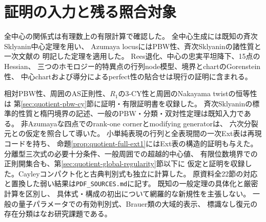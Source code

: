 \documentclass[11pt,a4paper]{ltjsarticle}
\begin{document}








\section{証明の入力と残る照合対象}
全中心の関係式は有理数上の有限計算で確認した。
全中心生成には既知の斉次Sklyanin中心定理を用い、
Azumaya locusにはPBW性、斉次Sklyaninの諸性質と
一次文献\cite{WWYSklyanin,LevasseurNoncomm,BrownMacleod}の
明記した定理を適用した。
Rees退化、中心の忠実平坦降下、15点のHessian、
三つのホモロジー的特異点の行列node模型、境界とchartのGorenstein性、
中心chartおよび導分によるperfect性の貼合せは現行の証明に含まれる。

相対PBW性、周囲のAS正則性、$R_1$の3-CY性と周囲のNakayama twistの恒等性は
第\ref{sec:quotient-pbw-cy}節に証明・有限証明書を収録した。
斉次Sklyaninの標準的性質と楕円境界の記述、一般のPBW・分類・双対性定理は既知入力である。
非Azumayaな四点でのrank-one cornerとmodifying generatorは、
六次分裂元と\cite[Theorem~5.1(1)]{IW}の仮定を照合して導いた。
小単純表現の行列と全表現間の一次Ext表は再現コードを持ち、
命題\ref{prop:quotient-full-ext1}にはExt表の構造的証明も与えた。
分離型三次式の必要十分条件、一般周囲での超越的中心値、
有限位数境界での正則開集合も、第\ref{sec:quotient-global-regularity}節以下に
仮定と証明を収録した。Cayleyコンパクト化と古典判別式も独立に計算した。
原資料全22節の対応と置換した弱い結果は\texttt{PDF\_SOURCES.md}に記す。
既知の一般定理の具体化と厳密計算を区別し、
具体式・構成の初出について網羅的な新規性を主張しない。
一般の量子パラメータでの有効判別式、Brauer類の大域的表示、
標識なし復元の存在分類はなお研究課題である。
\end{document}
